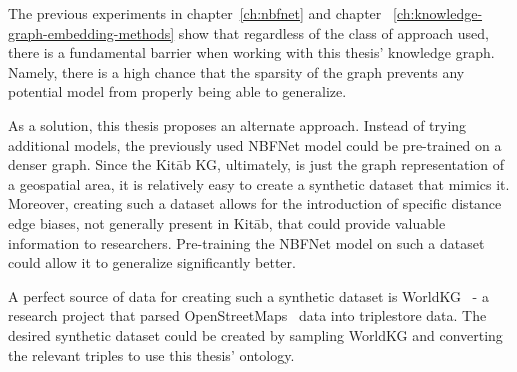 The previous experiments in chapter~\ref{ch:nbfnet} and chapter ~\ref{ch:knowledge-graph-embedding-methods} show that regardless of the class of approach used,
there is a fundamental barrier when working with this thesis' knowledge graph.
Namely, there is a high chance that the sparsity of the graph prevents
any potential model from properly being able to generalize.

As a solution, this thesis proposes an alternate approach.
Instead of trying additional models, the previously used
NBFNet model could be pre-trained on a denser graph.
Since the Kitāb KG, ultimately, is just the graph representation of a geospatial area,
it is relatively easy to create a synthetic dataset that mimics it.
Moreover, creating such a dataset allows for the introduction of specific distance edge biases, not generally present in Kitāb, that could provide valuable information to researchers.
Pre-training the NBFNet model on such a dataset could allow it to generalize significantly better.

A perfect source of data for creating such a synthetic dataset is WorldKG~\cite{WorldKG} - a research project that parsed OpenStreetMaps~\cite{OpenStreetMap} data into triplestore data.
The desired synthetic dataset could be created by sampling WorldKG and converting the relevant triples to use this thesis' ontology.